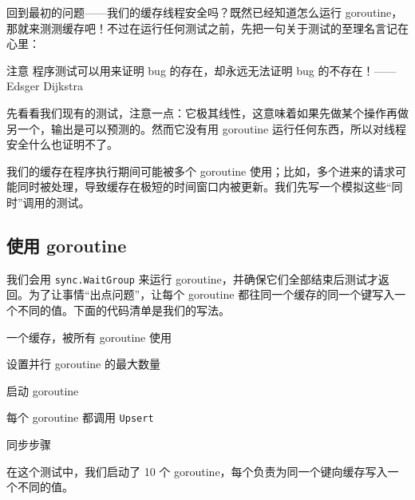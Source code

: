 回到最初的问题——我们的缓存线程安全吗？既然已经知道怎么运行 goroutine，那就来测测缓存吧！不过在运行任何测试之前，先把一句关于测试的至理名言记在心里：

\begin{infobox}{注意}
程序测试可以用来证明 bug 的存在，却永远无法证明 bug 的不存在！——Edsger Dijkstra
\end{infobox}

先看看我们现有的测试，注意一点：它极其线性，这意味着如果先做某个操作再做另一个，输出是可以预测的。然而它没有用 goroutine 运行任何东西，所以对线程安全什么也证明不了。

我们的缓存在程序执行期间可能被多个 goroutine 使用；比如，多个进来的请求可能同时被处理，导致缓存在极短的时间窗口内被更新。我们先写一个模拟这些``同时''调用的测试。

\subsection{使用 goroutine}

我们会用 \texttt{sync.WaitGroup} 来运行 goroutine，并确保它们全部结束后测试才返回。为了让事情``出点问题''，让每个 goroutine 都往同一个缓存的同一个键写入一个不同的值。下面的代码清单是我们的写法。


\begin{codeannotations}
\item 一个缓存，被所有 goroutine 使用
\item 设置并行 goroutine 的最大数量
\item 启动 goroutine
\item 每个 goroutine 都调用 \texttt{Upsert}
\item 同步步骤
\end{codeannotations}

在这个测试中，我们启动了 10 个 goroutine，每个负责为同一个键向缓存写入一个不同的值。


